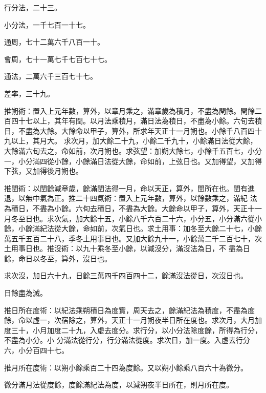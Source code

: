 \begin{pinyinscope}
 行分法，二十三。



 小分法，一千七百一十七。



 通周，七十二萬六千八百一十。



 會周，七十一萬七千七百七十七。



 通法，二萬六千三百七十七。



 差率，三十九。



 推朔術：置入上元年數，算外，以章月乘之，滿章歲為積月，不盡為閏餘。閏餘二百四十七以上，其年有閏。以月法乘積月，滿日法為積日，不盡為小餘。六旬去積日，不盡為大餘。大餘命以甲子，算外，所求年天正十一月朔也。小餘千八百四十九以上，其月大。
 求次月，加大餘二十九，小餘二千九十，小餘滿日法從大餘，大餘滿六旬去之，命如前，次月朔也。求弦望：加朔大餘七，小餘千五百七，小分一，小分滿四從小餘，小餘滿日法從大餘，命如前，上弦日也。又加得望，又加得下弦，又加得後月朔也。



 推閏術：以閏餘減章歲，餘滿閏法得一月，命以天正，算外，閏所在也。閏有進退，以無中氣為正。推二十四氣術：置入上元年數，算外，以餘數乘之，滿紀
 法為積日，不盡為小餘。六旬去積日，不盡為大餘。大餘命以甲子，算外，天正十一月冬至日也。求次氣，加大餘十五，小餘八千六百二十六，小分五，小分滿六從小餘，小餘滿紀法從大餘，命如前，次氣日也。求土用事：加冬至大餘二十七，小餘萬五千五百二十八，季冬土用事日也。又加大餘九十一，小餘萬二千二百七十，次土用事日也。推沒術：以九十乘冬至小餘，以減沒分，滿沒法為日，不
 盡為日餘，命日以冬至，算外，沒日也。



 求次沒，加日六十九，日餘三萬四千四百四十二，餘滿沒法從日，次沒日也。



 日餘盡為滅。



 推日所在度術：以紀法乘朔積日為度實，周天去之，餘滿紀法為積度，不盡為度餘，命以虛一，次宿除之，算外，天正十一月朔夜半日所在度也。求次月，大月加度三十，小月加度二十九，入虛去度分。求行分，以小分法除度餘，所得為行分，不盡為小分。小
 分滿法從行分，行分滿法從度。求次日，加一度。入虛去行分六，小分百四十七。



 推月所在度術：以朔小餘乘百二十四為度餘。又以朔小餘乘八百六十為微分。



 微分滿月法從度餘，度餘滿紀法為度，以減朔夜半日所在，則月所在度。




\end{pinyinscope}
